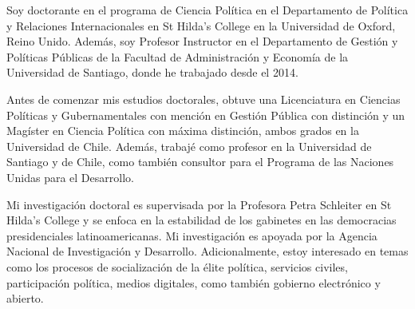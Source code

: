 




\vspace{3mm}

\begin{cvparagraph}

Soy doctorante en el programa de Ciencia Política en el Departamento de Política y Relaciones Internacionales en St Hilda's College en la Universidad de Oxford, Reino Unido. Además, soy Profesor Instructor en el Departamento de Gestión y Políticas Públicas de la Facultad de Administración y Economía de la Universidad de Santiago, donde he trabajado desde el 2014.

Antes de comenzar mis estudios doctorales, obtuve una Licenciatura en Ciencias Políticas y Gubernamentales con mención en Gestión Pública con distinción y un Magíster en Ciencia Política con máxima distinción, ambos grados en la Universidad de Chile. Además, trabajé como profesor en la Universidad de Santiago y de Chile, como también consultor para el Programa de las Naciones Unidas para el Desarrollo.

Mi investigación doctoral es supervisada por la Profesora Petra Schleiter en St Hilda's College y se enfoca en la estabilidad de los gabinetes en las democracias presidenciales latinoamericanas. Mi investigación es apoyada por la Agencia Nacional de Investigación y Desarrollo. Adicionalmente, estoy interesado en temas como los procesos de socialización de la élite política, servicios civiles, participación política, medios digitales, como también gobierno electrónico y abierto.
\vspace{1mm}
\end{cvparagraph}

